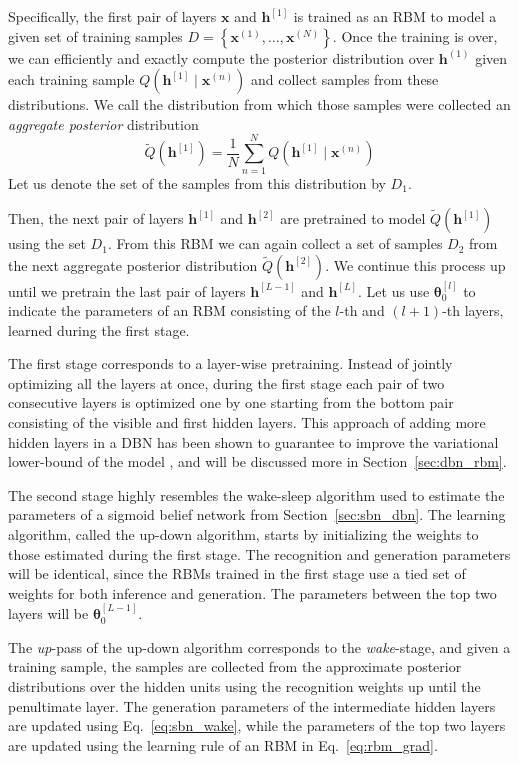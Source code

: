 \documentclass[dissertation,nocontribution,draft*]{aaltoseries}
\newcommand{\qlay}[1]{\left[#1\right]}
\newcommand{\vect}[1]{\mathbf{#1}}
\newcommand{\vects}[1]{\boldsymbol{#1}}
\newcommand{\vh}[0]{\vect{h}}
\newcommand{\vx}[0]{\vect{x}}
\newcommand{\TT}[0]{{\vects{\theta}}}
\begin{document}
Specifically, the first pair of layers $\vx$ and
$\vh^{\qlay{1}}$
is trained as an RBM to model a given set of training
samples $D=\left\{ \vx^{(1)}, \dots, \vx^{(N)} \right\}$.
Once the training is over, we can efficiently and exactly
compute the posterior distribution over $\vh^{(1)}$ given
each training sample $Q(\vh^{\qlay{1}} \mid \vx^{(n)})$ and
collect samples from these distributions. We call the
distribution from which those samples were collected an
\textit{aggregate posterior} distribution
\[
\tilde{Q}\left( \vh^{\qlay{1}} \right) = \frac{1}{N}
\sum_{n=1}^N Q\left(\vh^{\qlay{1}} \mid \vx^{(n)}\right)
\]
Let us denote the set of the samples from this distribution by $D_1$. 

Then, the next pair of layers $\vh^{\qlay{1}}$ and
$\vh^{\qlay{2}}$ are pretrained to model $\tilde{Q}\left(
\vh^{\qlay{1}} \right)$ using the set $D_1$. From this RBM
we can again collect a set of samples $D_2$ from the next
aggregate posterior distribution $\tilde{Q}\left(
\vh^{\qlay{2}} \right)$. We continue this process up until
we pretrain the last pair of layers $\vh^{\qlay{L-1}}$ and
$\vh^{\qlay{L}}$. Let us use $\TT_0^{\qlay{l}}$ to indicate the
parameters of an RBM consisting of the $l$-th and $(l+1)$-th
layers, learned during the first stage.

The first stage corresponds to a layer-wise pretraining.
Instead of jointly optimizing all the layers at once, during
the first stage each pair of two consecutive layers is
optimized one by one starting from the bottom pair
consisting of the visible and first hidden layers. This
approach of adding more hidden layers in a DBN has been
shown to guarantee to improve the variational lower-bound of
the model \citep{Hinton2006nc}, and will be discussed more
in Section~\ref{sec:dbn_rbm}.

The second stage highly resembles the wake-sleep algorithm
used to estimate the parameters of a sigmoid belief network
from Section~\ref{sec:sbn_dbn}. The learning algorithm,
called the up-down algorithm, starts by initializing the
weights to those estimated during the first stage. The
recognition and generation parameters will be identical,
since the RBMs trained in the first stage use a tied set of
weights for both inference and generation. The parameters
between the top two layers will be $\TT_0^{\qlay{L-1}}$.

The \textit{up}-pass of the up-down algorithm corresponds to
the \textit{wake}-stage, and given a training sample, the
samples are collected from the approximate posterior
distributions over the hidden units using the recognition
weights up until the penultimate layer. The generation
parameters of the intermediate hidden layers are updated
using Eq.~\eqref{eq:sbn_wake}, while the parameters of the
top two layers are updated using the learning rule of an RBM
in Eq.~\eqref{eq:rbm_grad}.
\end{document}
